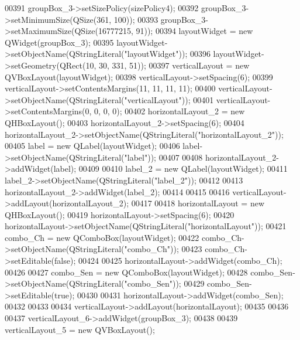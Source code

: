 \begin{DoxyCode}
00391         groupBox\_3->setSizePolicy(sizePolicy4);
00392         groupBox\_3->setMinimumSize(QSize(361, 100));
00393         groupBox\_3->setMaximumSize(QSize(16777215, 91));
00394         layoutWidget = \textcolor{keyword}{new} QWidget(groupBox\_3);
00395         layoutWidget->setObjectName(QStringLiteral(\textcolor{stringliteral}{"layoutWidget"}));
00396         layoutWidget->setGeometry(QRect(10, 30, 331, 51));
00397         verticalLayout = \textcolor{keyword}{new} QVBoxLayout(layoutWidget);
00398         verticalLayout->setSpacing(6);
00399         verticalLayout->setContentsMargins(11, 11, 11, 11);
00400         verticalLayout->setObjectName(QStringLiteral(\textcolor{stringliteral}{"verticalLayout"}));
00401         verticalLayout->setContentsMargins(0, 0, 0, 0);
00402         horizontalLayout\_2 = \textcolor{keyword}{new} QHBoxLayout();
00403         horizontalLayout\_2->setSpacing(6);
00404         horizontalLayout\_2->setObjectName(QStringLiteral(\textcolor{stringliteral}{"horizontalLayout\_2"}));
00405         label = \textcolor{keyword}{new} QLabel(layoutWidget);
00406         label->setObjectName(QStringLiteral(\textcolor{stringliteral}{"label"}));
00407 
00408         horizontalLayout\_2->addWidget(label);
00409 
00410         label\_2 = \textcolor{keyword}{new} QLabel(layoutWidget);
00411         label\_2->setObjectName(QStringLiteral(\textcolor{stringliteral}{"label\_2"}));
00412 
00413         horizontalLayout\_2->addWidget(label\_2);
00414 
00415 
00416         verticalLayout->addLayout(horizontalLayout\_2);
00417 
00418         horizontalLayout = \textcolor{keyword}{new} QHBoxLayout();
00419         horizontalLayout->setSpacing(6);
00420         horizontalLayout->setObjectName(QStringLiteral(\textcolor{stringliteral}{"horizontalLayout"}));
00421         combo\_Ch = \textcolor{keyword}{new} QComboBox(layoutWidget);
00422         combo\_Ch->setObjectName(QStringLiteral(\textcolor{stringliteral}{"combo\_Ch"}));
00423         combo\_Ch->setEditable(\textcolor{keyword}{false});
00424 
00425         horizontalLayout->addWidget(combo\_Ch);
00426 
00427         combo\_Sen = \textcolor{keyword}{new} QComboBox(layoutWidget);
00428         combo\_Sen->setObjectName(QStringLiteral(\textcolor{stringliteral}{"combo\_Sen"}));
00429         combo\_Sen->setEditable(\textcolor{keyword}{true});
00430 
00431         horizontalLayout->addWidget(combo\_Sen);
00432 
00433 
00434         verticalLayout->addLayout(horizontalLayout);
00435 
00436 
00437         verticalLayout\_6->addWidget(groupBox\_3);
00438 
00439         verticalLayout\_5 = \textcolor{keyword}{new} QVBoxLayout();

\end{DoxyCode}
